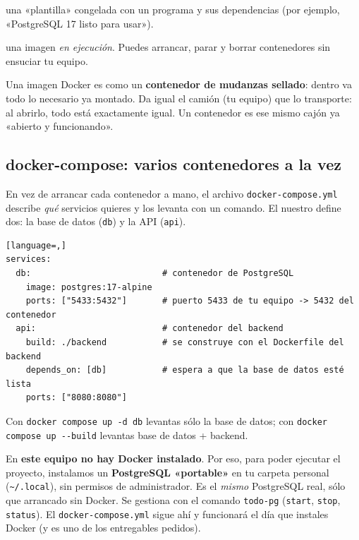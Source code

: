 \documentclass[11pt,a4paper]{article}
\newcommand{\code}[1]{\texttt{#1}}
\begin{document}
\begin{description}[leftmargin=*]
  \item[Imagen] una «plantilla» congelada con un programa y sus dependencias
  (por ejemplo, «PostgreSQL 17 listo para usar»).
  \item[Contenedor] una imagen \emph{en ejecución}. Puedes arrancar, parar y
  borrar contenedores sin ensuciar tu equipo.
\end{description}

\begin{analogia}
Una imagen Docker es como un \textbf{contenedor de mudanzas sellado}: dentro va
todo lo necesario ya montado. Da igual el camión (tu equipo) que lo transporte:
al abrirlo, todo está exactamente igual. Un contenedor es ese mismo cajón ya
«abierto y funcionando».
\end{analogia}

\subsection{docker-compose: varios contenedores a la vez}

En vez de arrancar cada contenedor a mano, el archivo \verb|docker-compose.yml|
describe \emph{qué} servicios quieres y los levanta con un comando. El nuestro
define dos: la base de datos (\code{db}) y la API (\code{api}).

\begin{lstlisting}[language=,]
services:
  db:                          # contenedor de PostgreSQL
    image: postgres:17-alpine
    ports: ["5433:5432"]       # puerto 5433 de tu equipo -> 5432 del contenedor
  api:                         # contenedor del backend
    build: ./backend           # se construye con el Dockerfile del backend
    depends_on: [db]           # espera a que la base de datos esté lista
    ports: ["8080:8080"]
\end{lstlisting}

Con \verb|docker compose up -d db| levantas sólo la base de datos; con
\verb|docker compose up --build| levantas base de datos + backend.

\begin{ojo}
En \textbf{este equipo no hay Docker instalado}. Por eso, para poder ejecutar el
proyecto, instalamos un \textbf{PostgreSQL «portable»} en tu carpeta personal
(\verb|~/.local|), sin permisos de administrador. Es el \emph{mismo} PostgreSQL
real, sólo que arrancado sin Docker. Se gestiona con el comando \code{todo-pg}
(\code{start}, \code{stop}, \code{status}). El \verb|docker-compose.yml| sigue
ahí y funcionará el día que instales Docker (y es uno de los entregables pedidos).
\end{ojo}
\end{document}

